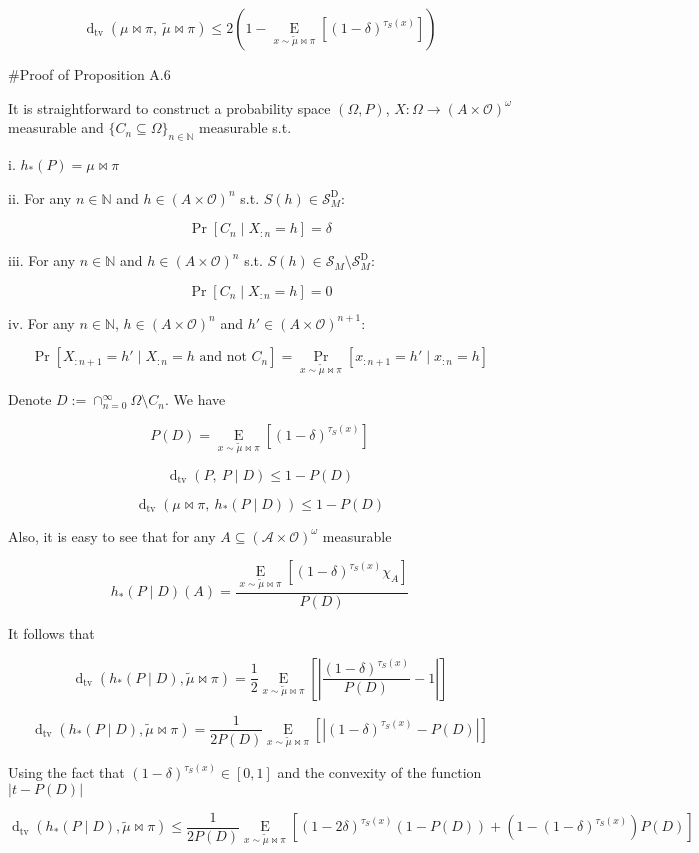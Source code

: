 \documentclass[a4paper]{article}
\newcommand{\AP}[1]{\left(#1\right)}
\newcommand{\AB}[1]{\left[#1\right]}
\newcommand{\Pa}[2]{\underset{#1}{\operatorname{Pr}}\AB{#2}}
\newcommand{\Ea}[2]{\underset{#1}{\operatorname{E}}\AB{#2}}
\newcommand{\Dtva}[1]{\operatorname{d}_{\text{tv}}\AP{#1}}
\newcommand{\Nats}{\mathbb{N}}
\newcommand{\Sq}[2]{\{#1\}_{#2 \in \Nats}}
\newcommand{\Sqn}[1]{\Sq{#1}{n}}
\newcommand{\Abs}[1]{\left\vert #1 \right\vert}
\newcommand{\Ob}{\mathcal{O}}
\newcommand{\A}{\mathcal{A}}
\newcommand{\St}{\mathcal{S}}
\newcommand{\RMD}{\mathrm{D}}
\newcommand{\SD}{\St^{\RMD}}
\begin{document}
$$\Dtva{\mu\bowtie\pi,\ \tilde{\mu}\bowtie\pi} \leq 2\AP{1-\Ea{x\sim\tilde{\mu}\bowtie\pi}{\AP{1-\delta}^{\tau_S(x)}}}$$

\#Proof of Proposition A.6

It is straightforward to construct a probability space $(\Omega,P)$, $X: \Omega \rightarrow (A \times \Ob)^\omega$ measurable and $\Sqn{C_n \subseteq \Omega}$ measurable s.t.

i. $h_*(P) = \mu\bowtie\pi$

ii. For any $n \in \Nats$ and $h \in (A \times \Ob)^n$ s.t. $S(h) \in \SD_M$: 

$$\Pa{}{C_n \mid X_{:n} = h} = \delta$$

iii. For any $n \in \Nats$ and $h \in (A \times \Ob)^n$ s.t. $S(h) \in \St_M \setminus \SD_M$: 

$$\Pa{}{C_n \mid X_{:n} = h} = 0$$

iv. For any $n \in \Nats$, $h \in (A \times \Ob)^n$ and $h' \in (A \times \Ob)^{n+1}$:

$$\Pa{}{X_{:n+1}=h' \mid X_{:n} = h \text{ and not } C_n} = \Pa{x \sim \tilde{\mu}\bowtie\pi}{x_{:n+1}=h' \mid x_{:n} = h}$$

Denote $D:=\cap_{n=0}^\infty \Omega \setminus C_n$. We have

$$P(D) = \Ea{x\sim\tilde{\mu}\bowtie\pi}{\AP{1-\delta}^{\tau_S(x)}}$$

$$\Dtva{P,\ P \mid D} \leq 1 - P(D)$$

$$\Dtva{\mu\bowtie\pi,\ h_*\AP{P \mid D}} \leq 1 - P(D)$$

Also, it is easy to see that for any $A \subseteq (\A \times \Ob)^\omega$ measurable

$$h_*\AP{P \mid D}(A)=\frac{\Ea{x\sim\tilde{\mu}\bowtie\pi}{\AP{1-\delta}^{\tau_S(x)}\chi_A}}{P(D)}$$

It follows that

$$\Dtva{h_*\AP{P \mid D},\tilde{\mu}\bowtie\pi} = \frac{1}{2}\Ea{x\sim\tilde{\mu}\bowtie\pi}{\Abs{\frac{\AP{1-\delta}^{\tau_S(x)}}{P(D)}-1}}$$

$$\Dtva{h_*\AP{P \mid D},\tilde{\mu}\bowtie\pi} = \frac{1}{2P(D)}\Ea{x\sim\tilde{\mu}\bowtie\pi}{\Abs{\AP{1-\delta}^{\tau_S(x)}-P(D)}}$$

Using the fact that $\AP{1-\delta}^{\tau_S(x)}\in[0,1]$ and the convexity of the function $\Abs{t-P(D)}$

$$\Dtva{h_*\AP{P \mid D},\tilde{\mu}\bowtie\pi} \leq \frac{1}{2P(D)}\Ea{x\sim\tilde{\mu}\bowtie\pi}{\AP{1-2\delta}^{\tau_S(x)}\AP{1-P(D)}+\AP{1-\AP{1-\delta}^{\tau_S(x)}}P(D)}$$
\end{document}

